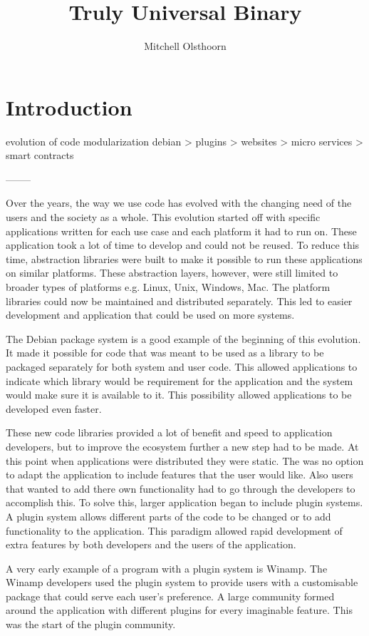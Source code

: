 \documentclass[a4paper]{article}
\title{Truly Universal Binary}
\author{Mitchell Olsthoorn}
\begin{document}
\maketitle

\section{Introduction}

evolution of code modularization
debian > plugins > websites > micro services > smart contracts

--------

Over the years, the way we use code has evolved with the changing need of the users and the society as a whole. This evolution started off with specific applications written for each use case and each platform it had to run on. These application took a lot of time to develop and could not be reused. To reduce this time, abstraction libraries were built to make it possible to run these applications on similar platforms. These abstraction layers, however, were still limited to broader types of platforms e.g. Linux, Unix, Windows, Mac. The platform libraries could now be maintained and distributed separately. This led to easier development and application that could be used on more systems.

The Debian package system is a good example of the beginning of this evolution. It made it possible for code that was meant to be used as a library to be packaged separately for both system and user code. This allowed applications to indicate which library would be requirement for the application and the system would make sure it is available to it. This possibility allowed applications to be developed even faster.

These new code libraries provided a lot of benefit and speed to application developers, but to improve the ecosystem further a new step had to be made. At this point when applications were distributed they were static. The was no option to adapt the application to include features that the user would like. Also users that wanted to add there own functionality had to go through the developers to accomplish this. To solve this, larger application began to include plugin systems. A plugin system allows different parts of the code to be changed or to add functionality to the application. This paradigm allowed rapid development of extra features by both developers and the users of the application.

A very early example of a program with a plugin system is Winamp. The Winamp developers used the plugin system to provide users with a customisable package that could serve each user's preference. A large community formed around the application with different plugins for every imaginable feature. This was the start of the plugin community.
\end{document}
